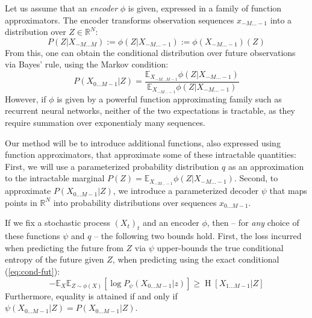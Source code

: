 \documentclass[11pt,letterpaper]{article}
\newcommand{\E}[0]{\mathbb{E}}
\begin{document}
Let us assume that an \emph{encoder} $\phi$ is given, expressed in a family of function approximators. %
The encoder transforms observation sequences $x_{-M\dots -1}$ into a distribution over $Z \in \mathbb{R}^N$: 
\begin{equation}
	P(Z|X_{-M\dots M}) := \phi(Z|X_{-M\dots-1}) := \phi(X_{-M\dots-1})(Z)
\end{equation}
From this, one can obtain the conditional distribution over future observations via Bayes' rule, using the Markov condition:
\begin{equation}\label{eq:cond-fut}
	P(X_{0\dots M-1}|Z) = \frac{\E_{X_{-M \dots M-1}} \phi(Z|X_{-M\dots-1})}{\E_{X_{-M \dots -1}} \phi(Z|X_{-M \dots -1})}
\end{equation}
However, if $\phi$ is given by a powerful function approximating family such as recurrent neural networks, neither of the two expectations is tractable,  as they require summation over exponentialy many sequences.

Our method will be to introduce additional functions, also expressed using function approximators, that approximate some of these intractable quantities:
First, we will use a parameterized probability distribution $q$ as an approximation to the intractable marginal $P(Z) = \E_{X_{-M \dots -1}} \phi(Z|X_{-M \dots -1})$.
Second, to approximate $P(X_{0\dots M-1}|Z)$, we introduce a parameterized decoder $\psi$ that maps points in $\mathbb{R}^N$  into probability distributions over sequences $x_{0\dots M-1}$.

If we fix a stochastic process $(X_t)_t$ and an encoder $\phi$, then -- for \emph{any} choice of these functions $\psi$ and $q$ -- the following two bounds hold.
First, the loss incurred when predicting the future from $Z$ via $\psi$ upper-bounds the true conditional entropy of the future given $Z$, when predicting using the exact conditional (\ref{eq:cond-fut}):
\begin{equation}\label{ineq1}
	-	\mathbb{E}_{X}\mathbb{E}_{Z \sim \phi(X)}\left[\log P_\psi(X_{0\dots M-1} | z)\right] \geq \operatorname{H}[X_{1\dots M-1}|Z]
\end{equation}
Furthermore, equality is attained if and only if $\psi(X_{0\dots M-1}|Z) = P(X_{0\dots M-1}|Z)$.
\end{document}
